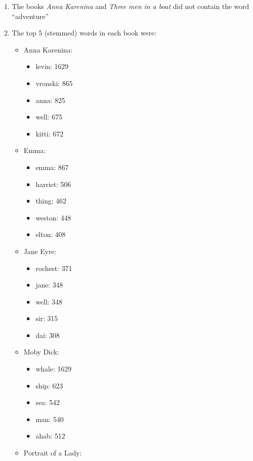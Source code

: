 \documentclass[a4paper,11pt,oneside]{book}
\begin{document}
\begin{enumerate}
\begin{enumerate}
					\item The books \emph{Anna Karenina} and \emph{Three men in a boat} did not contain the word ``adventure''
					\item The top 5 (stemmed) words in each book were:
								\begin{itemize}
									\item Anna Karenina:
												\begin{itemize}
													\item{levin:		1629}
													\item{vronski:	865}
													\item{anna:	825}
													\item{well:		675}
													\item{kitti:		672}
												\end{itemize}
									\item Emma:
												\begin{itemize}
													\item{emma:	867}
													\item{harriet:	506}
													\item{thing:	462}
													\item{weston:	448}
													\item{elton:	408}
												\end{itemize}
									\item Jane Eyre:
												\begin{itemize}
													\item{rochest:	371}
													\item{jane:		348}
													\item{well:		348}
													\item{sir:	315}
													\item{dai:	308}
												\end{itemize}
									\item Moby Dick:
												\begin{itemize}
													\item{whale:	1629}
													\item{ship:		623}
													\item{sea:		542}
													\item{man:		540}
													\item{ahab:	512}
												\end{itemize}
									\item Portrait of a Lady:

\end{itemize}
\end{enumerate}
\end{enumerate}
\end{document}
